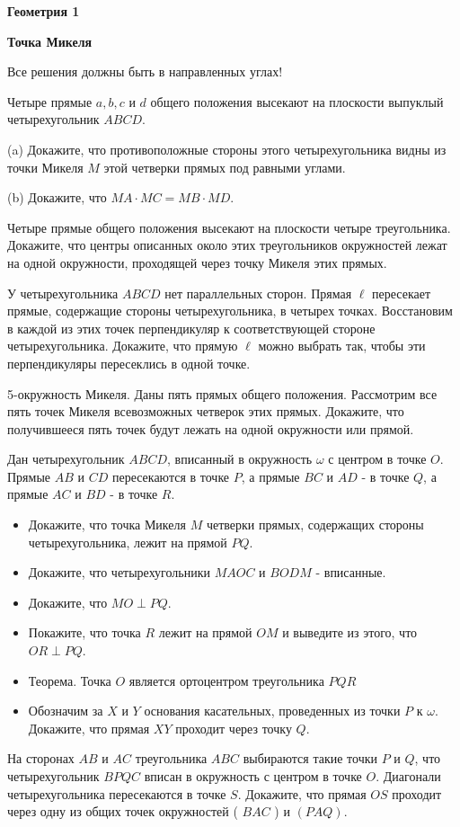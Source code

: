 \centerline{\bf \Huge Геометрия 1}
\centerline{\bf \Huge Точка Микеля}

\begin{flushright}
        \scriptsize{Все решения должны быть в направленных углах!}
\end{flushright}

Четыре прямые $a, b, c$ и $d$ общего положения высекают на плоскости выпуклый четырехугольник $A B C D$.

(a) Докажите, что противоположные стороны этого четырехугольника видны из точки Микеля $M$ этой четверки прямых под равными углами.

(b) Докажите, что $M A \cdot M C=M B \cdot M D$.

Четыре прямые общего положения высекают на плоскости четыре треугольника. Докажите, что центры описанных около этих треугольников окружностей лежат на одной окружности, проходящей через точку Микеля этих прямых.

У четырехугольника $A B C D$ нет параллельных сторон. Прямая $\ell$ пересекает прямые, содержащие стороны четырехугольника, в четырех точках. Восстановим в каждой из этих точек перпендикуляр к соответствующей стороне четырехугольника. Докажите, что прямую $\ell$ можно выбрать так, чтобы эти перпендикуляры пересеклись в одной точке.

5-окружность Микеля. Даны пять прямых общего положения. Рассмотрим все пять точек Микеля всевозможных четверок этих прямых. Докажите, что получившееся пять точек будут лежать на одной окружности или прямой.

Дан четырехугольник $A B C D$, вписанный в окружность $\omega$ с центром в точке $O$. Прямые $A B$ и $C D$ пересекаются в точке $P$, а прямые $B C$ и $A D$ - в точке $Q$, а прямые $A C$ и $B D$ - в точке $R$.
\begin{itemize}
    \item[(a)] Докажите, что точка Микеля $M$ четверки прямых, содержащих стороны четырехугольника, лежит на прямой $P Q$.

    \item[(b)] Докажите, что четырехугольники $M A O C$ и $B O D M$ - вписанные.

    \item[(c)] Докажите, что $M O \perp P Q$.

    \item[(d)] Покажите, что точка $R$ лежит на прямой $O M$ и выведите из этого, что $O R \perp P Q$.

    \item[(e)] Теорема. Точка $O$ является ортоцентром треугольника $P Q R$

    \item[(f)] Обозначим за $X$ и $Y$ основания касательных, проведенных из точки $P$ к $\omega$. Докажите, что прямая $X Y$ проходит через точку $Q$.
\end{itemize}


На сторонах $A B$ и $A C$ треугольника $A B C$ выбираются такие точки $P$ и $Q$, что четырехугольник $B P Q C$ вписан в окружность с центром в точке $O$. Диагонали четырехугольника пересекаются в точке $S$. Докажите, что прямая $O S$ проходит через одну из общих точек окружностей ( $B A C$ ) и $(P A Q)$.